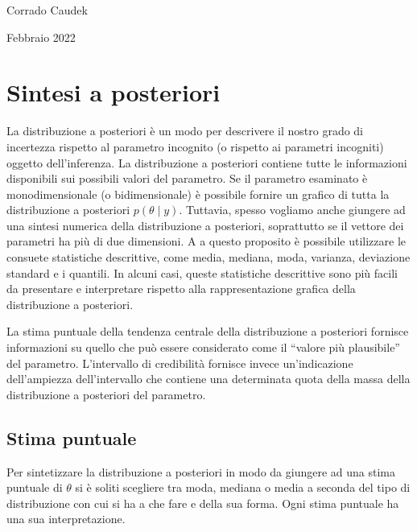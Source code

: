 \documentclass[
  11pt,
  italian,
  a4paper,
  extrafontsizes,onecolumn,openright
  ]{memoir}
\begin{document}
Corrado Caudek

\bigskip

Febbraio 2022

\mainmatter

\hypertarget{chapter-sintesi-distr-post}{%
\chapter{Sintesi a posteriori}\label{chapter-sintesi-distr-post}}

La distribuzione a posteriori è un modo per descrivere il nostro grado
di incertezza rispetto al parametro incognito (o rispetto ai parametri
incogniti) oggetto dell'inferenza. La distribuzione a posteriori
contiene tutte le informazioni disponibili sui possibili valori del
parametro. Se il parametro esaminato è monodimensionale (o
bidimensionale) è possibile fornire un grafico di tutta la distribuzione a posteriori \(p(\theta \mid y)\). Tuttavia, spesso vogliamo anche giungere ad una sintesi numerica della distribuzione a posteriori, soprattutto se il vettore dei parametri ha più di due dimensioni. A a questo proposito è possibile utilizzare le consuete statistiche descrittive, come media, mediana, moda, varianza, deviazione standard e i quantili. In alcuni casi, queste statistiche descrittive sono più facili da presentare e interpretare rispetto alla rappresentazione grafica della distribuzione a posteriori.

La stima puntuale della tendenza centrale della distribuzione a posteriori fornisce informazioni su quello che può essere considerato come il ``valore più plausibile'' del parametro. L'intervallo di credibilità fornisce invece un'indicazione dell'ampiezza dell'intervallo che contiene una determinata quota della massa della distribuzione a posteriori del parametro.

\hypertarget{stima-puntuale}{%
\section{Stima puntuale}\label{stima-puntuale}}

Per sintetizzare la distribuzione a posteriori in modo da giungere ad
una stima puntuale di \(\theta\) si è soliti scegliere tra moda, mediana o media a seconda del tipo di distribuzione con cui si ha a che fare e
della sua forma. Ogni stima puntuale ha una sua interpretazione.
\end{document}
